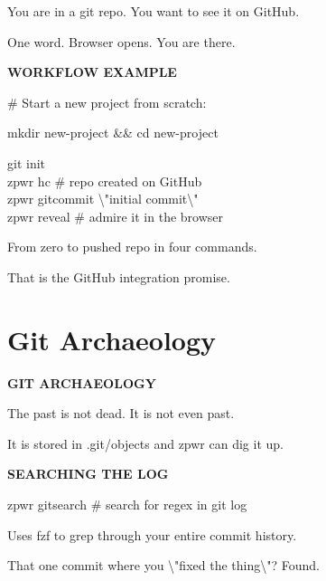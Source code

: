 \documentclass[11pt,a4paper,twoside]{book}
\begin{document}
You are in a git repo. You want to see it on GitHub.

One word. Browser opens. You are there.


\vspace{12pt}
{\bfseries\color{neonyellow} WORKFLOW EXAMPLE}\vspace{4pt}

\# Start a new project from scratch:

mkdir new-project \&\& cd new-project

\begin{codebox}
git init\\
zpwr hc               \# repo created on GitHub\\
zpwr gitcommit \textbackslash{}"initial commit\textbackslash{}"\\
zpwr reveal            \# admire it in the browser\\
\end{codebox}

From zero to pushed repo in four commands.

That is the GitHub integration promise.


\vspace{16pt}

\section{Git Archaeology}


\vspace{10pt}
{\large\bfseries\color{neoncyan} GIT ARCHAEOLOGY}\vspace{6pt}

The past is not dead. It is not even past.

\begin{codebox}
It is stored in .git/objects and zpwr can dig it up.\\
\end{codebox}


\vspace{12pt}
{\bfseries\color{neonyellow} SEARCHING THE LOG}\vspace{4pt}

\begin{codebox}
zpwr gitsearch             \# search for regex in git log\\
\end{codebox}

Uses fzf to grep through your entire commit history.

That one commit where you \textbackslash{}"fixed the thing\textbackslash{}"? Found.
\end{document}
